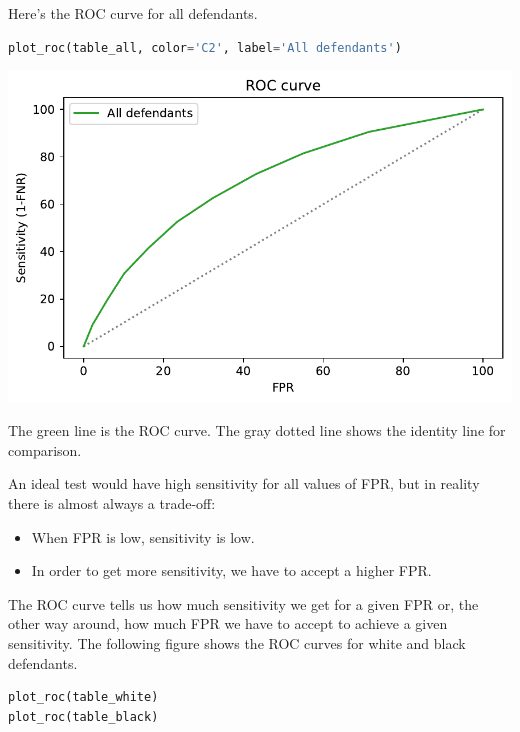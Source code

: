 Here's the ROC curve for all defendants.

\begin{lstlisting}[language=Python,style=source]
plot_roc(table_all, color='C2', label='All defendants')
\end{lstlisting}

\begin{center}
\includegraphics[scale=0.75]{02_calibration_files/02_calibration_64_0.pdf}
\end{center}

The green line is the ROC curve. The gray dotted line shows the identity
line for comparison.

An ideal test would have high sensitivity for all values of FPR, but in
reality there is almost always a trade-off:

\begin{itemize}
\item
  When FPR is low, sensitivity is low.
\item
  In order to get more sensitivity, we have to accept a higher FPR.
\end{itemize}

The ROC curve tells us how much sensitivity we get for a given FPR or,
the other way around, how much FPR we have to accept to achieve a given
sensitivity. The following figure shows the ROC curves for white and
black defendants.

\begin{lstlisting}[language=Python,style=source]
plot_roc(table_white)
plot_roc(table_black)
\end{lstlisting}

